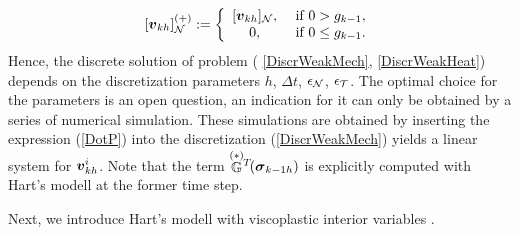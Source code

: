 \documentclass[12pt,a4paper]{scrbook}
\begin{document}
\begin{equation}\nonumber
[\mbox{\boldmath$v$}_{kh}]^{(+)}_{{\mathcal{N}}}:=
\left\{
\begin{array}{cc}
[\mbox{\boldmath$v$}_{kh}]_{{\mathcal{N}}}, & \mbox{ if }0>g_{k-1}, \\
0, &\mbox{ if } 0\leq g_{k-1}. \\
\end{array}
\right.
\end{equation}
Hence, the discrete solution of problem  ( \ref{DiscrWeakMech}, \ref{DiscrWeakHeat}) depends on the discretization parameters $h$, $\Delta t$, $\epsilon_{{\mathcal{N}}}$, $\epsilon_{{\mathcal{T}}}$. The optimal choice for the parameters is an open question, an indication for it can only be obtained by a series of numerical simulation. These simulations are obtained by inserting the expression  (\ref{DotP}) into the discretization  (\ref{DiscrWeakMech}) yields a linear system for $\mbox{\boldmath$v$}^{i}_{kh}$. Note that the term $\stackrel{(*)}{{\mathbb G}}\!\!{}^T\!(\mbox{\boldmath$\sigma$}_{{k-1}h})$ is explicitly computed with Hart's modell at the former time step. 

Next, we introduce Hart's modell with viscoplastic interior variables \cite{DonigaDipl05}. 
\end{document}
